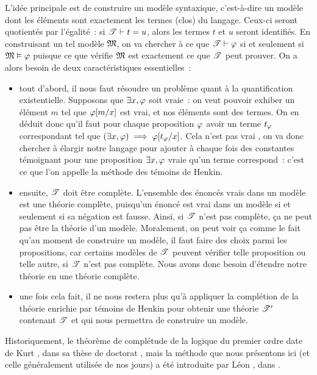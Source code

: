 L'idée principale est de construire un modèle syntaxique, c'est-à-dire un modèle
dont les éléments sont exactement les termes (clos) du langage. Ceux-ci seront
quotientés par l'égalité~: si $\mathscr T \vdash t = u$, alors les termes $t$ et
$u$ seront identifiés. En construisant un tel modèle $\mathfrak{M}$, on va
chercher à ce que $\mathscr T \vdash \varphi$ si et seulement si
$\mathfrak{M}\vDash \varphi$ puisque ce que vérifie $\mathfrak{M}$ est exactement ce
que $\mathscr T$ peut prouver. On a alors besoin de deux caractéristiques
essentielles~:
\begin{itemize}
\item tout d'abord, il nous faut résoudre un problème quant à la quantification
  existentielle. Supposons que $\exists x,\varphi$ soit vraie~: on veut pouvoir
  exhiber un élément $m$ tel que $\varphi[m/x]$ est vrai, et nos éléments sont
  des termes.
  On en déduit donc qu'il faut pour chaque proposition $\varphi$ avoir un
  terme $t_{\varphi}$ correspondant tel que
  $(\exists x, \varphi) \implies \varphi[t_{\varphi}/x]$. Cela n'est
  pas vrai , on va donc chercher à élargir notre langage
  pour ajouter à chaque fois des constantes témoignant pour une proposition
  $\exists x,\varphi$ vraie qu'un terme correspond~: c'est ce que l'on appelle la
  méthode des témoins de Henkin.
\item ensuite, $\mathscr T$ doit être complète. L'ensemble des énoncés
  vrais dans un modèle est une théorie complète, puisqu'un énoncé est vrai dans
  un modèle si et seulement si sa négation est fausse. Ainsi, si $\mathscr T$
  n'est pas complète, ça ne peut pas être la théorie d'un modèle. Moralement, on
  peut voir ça comme le fait qu'au moment de construire un modèle, il faut faire
  des choix parmi les propositions, car certains modèles de $\mathscr T$ peuvent
  vérifier telle proposition ou telle autre, si $\mathscr T$ n'est pas complète.
  Nous avons donc besoin d'étendre notre théorie en une théorie complète.
\item une fois cela fait, il ne nous restera plus qu'à appliquer la complétion
  de la théorie enrichie par témoins de Henkin pour obtenir une théorie
  $\mathscr T'$ contenant $\mathscr T$ et qui nous permettra de
  construire un modèle.
\end{itemize}

Historiquement, le théorème de complétude de la logique du premier ordre date de
Kurt , dans sa thèse de doctorat \cite{Goedel1929}, mais la
méthode que nous présentons ici (et celle généralement utilisée de nos jours) a
été introduite par Léon , dans \cite{Henkin1949}.

